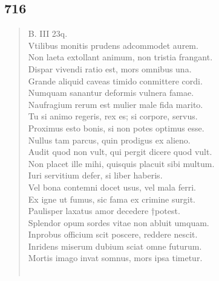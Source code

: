 \documentclass[11pt, a4paper]{report}
\begin{document}
            \subsection*{716}
      \begin{verse}
      B. III 23q. \\ Vtilibus monitis prudens adcommodet aurem. \\ Non laeta extollant animum, non tristia frangant. \\ Dispar vivendi ratio est, mors omnibus una. \\ Grande aliquid caveas timido conmittere cordi. \\ Numquam sanantur deformis vulnera famae. \\ Naufragium rerum est mulier male fida marito. \\ Tu si animo regeris, rex es; si corpore, servus. \\ Proximus esto bonis, si non potes optimus esse. \\ Nullus tam parcus, quin prodigus ex alieno. \\ Audit quod non vult, qui pergit dicere quod vult. \\ Non placet ille mihi, quisquis placuit sibi multum. \\ Iuri servitium defer, si liber haberis. \\ Vel bona contemni docet usus, vel mala ferri. \\ Ex igne ut fumus, sic fama ex crimine surgit. \\ Paulisper laxatus amor decedere †potest. \\ Splendor opum sordes vitae non abluit umquam. \\ Inprobus officium scit poscere, reddere nescit. \\ Inridens miserum dubium sciat omne futurum. \\ Mortis imago invat somnus, mors ipsa timetur. \\ 
        ﻿\pagebreak 

\end{verse}
\end{document}
